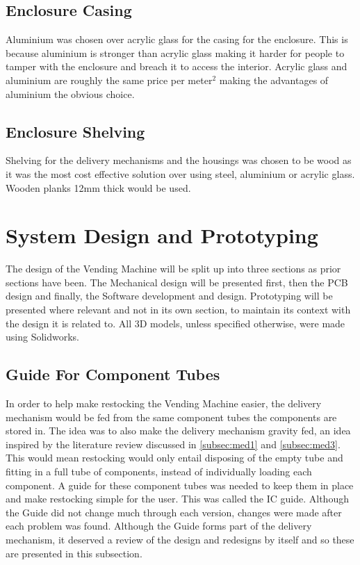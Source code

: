 \documentclass[a4paper,11pt]{article}
\numberwithin{figure}{section}
\numberwithin{table}{section}
\begin{document}
\subsection{Enclosure Casing}
Aluminium was chosen over acrylic glass for the casing for the enclosure. This is because aluminium is stronger than acrylic glass making it harder for people to tamper with the enclosure and breach it to access the interior. Acrylic glass and aluminium are roughly the same price per meter$^2$ making the advantages of aluminium the obvious choice.  

\subsection{Enclosure Shelving}
Shelving for the delivery mechanisms and the housings was chosen to be wood as it was the most cost effective solution over using steel, aluminium or acrylic glass. Wooden planks 12mm thick would be used.

\newpage
\section{System Design and Prototyping}\thispagestyle{sectionstart}
The design of the Vending Machine will be split up into three sections as prior sections have been. The Mechanical design will be presented first, then the PCB design and finally, the Software development and design. Prototyping will be presented where relevant and not in its own section, to maintain its context with the design it is related to. All 3D models, unless specified otherwise, were made using Solidworks.
\subsection{Guide For Component Tubes}
\label{subsec:Guide}
In order to help make restocking the Vending Machine easier, the delivery mechanism would be fed from the same component tubes the components are stored in. The idea was to also make the delivery mechanism gravity fed, an idea inspired by the literature review discussed in \autoref{subsec:med1} and \autoref{subsec:med3}. This would mean restocking would only entail disposing of the empty tube and fitting in a full tube of components, instead of individually loading each component. A guide for these component tubes was needed to keep them in place and make restocking simple for the user. This was called the IC guide. Although the Guide did not change much through each version, changes were made after each problem was found. Although the Guide forms part of the delivery mechanism, it deserved a review of the design and redesigns by itself and so these are presented in this subsection.
\end{document}
